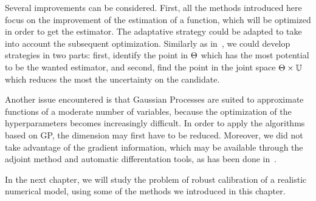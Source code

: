 \documentclass[../../Main_ManuscritThese.tex]{subfiles}
\begin{document}
Several improvements can be considered. First, all the methods
introduced here focus on the improvement of the estimation of a
function, which will be optimized in order to get the estimator. The
adaptative strategy could be adapted to take into account the subsequent
optimization. Similarly as in~\cite{janusevskis_simultaneous_2010}, we
could develop strategies in two parts: first, identify the point in
$\Theta$ which has the most potential to be the wanted estimator, and
second, find the point in the joint space $\Theta \times \mathbb{U}$
which reduces the most the uncertainty on the candidate.

Another issue encountered is that Gaussian Processes are suited to
approximate functions of a moderate number of variables, because the
optimization of the hyperparameters becomes increasingly difficult. In
order to apply the algorithms based on GP, the dimension may first
have to be reduced. Moreover, we did not take advantage of the
gradient information, which may be available through the adjoint
method and automatic differentation tools, as has been done
in~\cite{bouhlel_gradient-enhanced_2019,laurent_overview_2019,miranda_adjoint-based_2016,pardalos_differentiating_2015}.

In the next chapter, we will study the problem of robust calibration
of a realistic numerical model, using some of the methods we introduced in this chapter.


\end{document}

